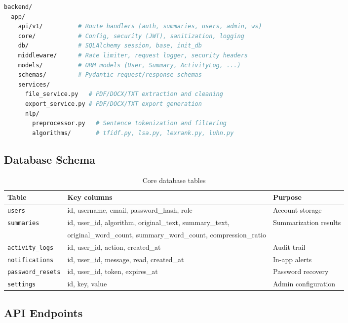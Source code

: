 \documentclass[12pt,a4paper]{article}
\begin{document}
\begin{lstlisting}[language=bash, caption={Backend directory layout}]
backend/
  app/
    api/v1/          # Route handlers (auth, summaries, users, admin, ws)
    core/            # Config, security (JWT), sanitization, logging
    db/              # SQLAlchemy session, base, init_db
    middleware/      # Rate limiter, request logger, security headers
    models/          # ORM models (User, Summary, ActivityLog, ...)
    schemas/         # Pydantic request/response schemas
    services/
      file_service.py   # PDF/DOCX/TXT extraction and cleaning
      export_service.py # PDF/DOCX/TXT export generation
      nlp/
        preprocessor.py   # Sentence tokenization and filtering
        algorithms/       # tfidf.py, lsa.py, lexrank.py, luhn.py
\end{lstlisting}

\subsection{Database Schema}

\begin{table}[H]
  \centering
  \caption{Core database tables}
  \begin{tabular}{@{}lll@{}}
    \toprule
    \textbf{Table} & \textbf{Key columns} & \textbf{Purpose} \\
    \midrule
    \texttt{users}         & id, username, email, password\_hash, role & Account storage \\
    \texttt{summaries}     & id, user\_id, algorithm, original\_text, summary\_text, & Summarization results \\
                           & original\_word\_count, summary\_word\_count, compression\_ratio & \\
    \texttt{activity\_logs} & id, user\_id, action, created\_at & Audit trail \\
    \texttt{notifications} & id, user\_id, message, read, created\_at & In-app alerts \\
    \texttt{password\_resets} & id, user\_id, token, expires\_at & Password recovery \\
    \texttt{settings}      & id, key, value & Admin configuration \\
    \bottomrule
  \end{tabular}
\end{table}

\subsection{API Endpoints}
\end{document}
